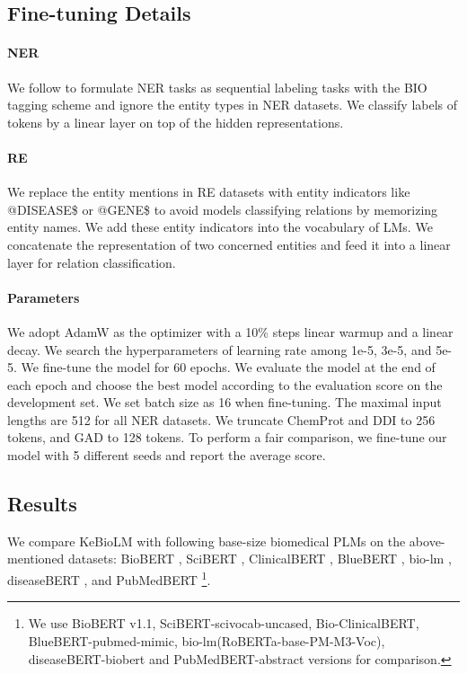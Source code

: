 \documentclass[11pt]{article}
\begin{document}
\subsection{Fine-tuning Details}
\paragraph{NER} We follow \citet{gu2020domain} to formulate NER tasks as sequential labeling tasks with the BIO tagging scheme and ignore the entity types in NER datasets.
We classify labels of tokens by a linear layer on top of the hidden representations.

\paragraph{RE} We replace the entity mentions in RE datasets with entity indicators like @DISEASE\$ or @GENE\$ to avoid models classifying relations by memorizing entity names.
We add these entity indicators into the vocabulary of LMs.
We concatenate the representation of two concerned entities and feed it into a linear layer for relation classification.

\paragraph{Parameters} We adopt AdamW as the optimizer with a 10\% steps linear warmup and a linear decay.
We search the hyperparameters of learning rate among 1e-5, 3e-5, and 5e-5.
We fine-tune the model for 60 epochs.
We evaluate the model at the end of each epoch and choose the best model according to the evaluation score on the development set.
We set batch size as 16 when fine-tuning.
The maximal input lengths are 512 for all NER datasets.
We truncate ChemProt and DDI to 256 tokens, and GAD to 128 tokens.
To perform a fair comparison, we fine-tune our model with 5 different seeds and report the average score.

\subsection{Results}
We compare KeBioLM with following base-size biomedical PLMs on the above-mentioned datasets: 
BioBERT \cite{lee2020biobert},
SciBERT \cite{beltagy-etal-2019-scibert}, 
ClinicalBERT \cite{alsentzer-etal-2019-publicly},
BlueBERT \cite{peng-etal-2019-transfer},
bio-lm \cite{lewis-etal-2020-pretrained},
diseaseBERT \cite{he-etal-2020-infusing},
and PubMedBERT \cite{gu2020domain} \footnote{We use BioBERT v1.1, SciBERT-scivocab-uncased, Bio-ClinicalBERT, BlueBERT-pubmed-mimic, bio-lm(RoBERTa-base-PM-M3-Voc), diseaseBERT-biobert and PubMedBERT-abstract versions for comparison.}.
\end{document}
